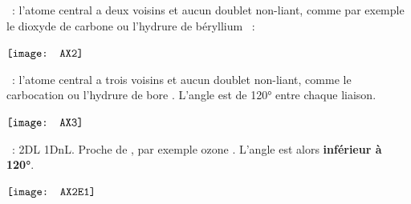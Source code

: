 \documentclass[../main/main.tex]{subfiles}
\begin{document}
\begin{itemize}[label=$\diamond$]
     ~: l'atome central a deux voisins et aucun
        doublet non-liant, comme par exemple le dioxyde de carbone  ou
        l'hydrure de béryllium ~:
        \begin{center}
            \hfill
            $\vcenter{\hbox{\texttt{[image: AX2]}}}$
            \hfill
            \hfill
            \hfill~
        \end{center}
     ~: l'atome central a trois voisins et
        aucun doublet non-liant, comme le carbocation  ou l'hydrure de bore
        . L'angle est de \ang{120} entre chaque liaison.
        \begin{center}
            \hfill
            $\vcenter{\hbox{\texttt{[image: AX3]}}}$
            \hfill
            \hfill
            \hfill~
        \end{center}
     ~: 2DL 1DnL. Proche de , par exemple ozone
        . L'angle est alors \textbf{inférieur à \ang{120}}.
        \begin{center}
            \hfill
            $\vcenter{\hbox{\texttt{[image: AX2E1]}}}$
            \hfill
            \hfill
            \hfill~
        \end{center}

\end{itemize}
\end{document}
